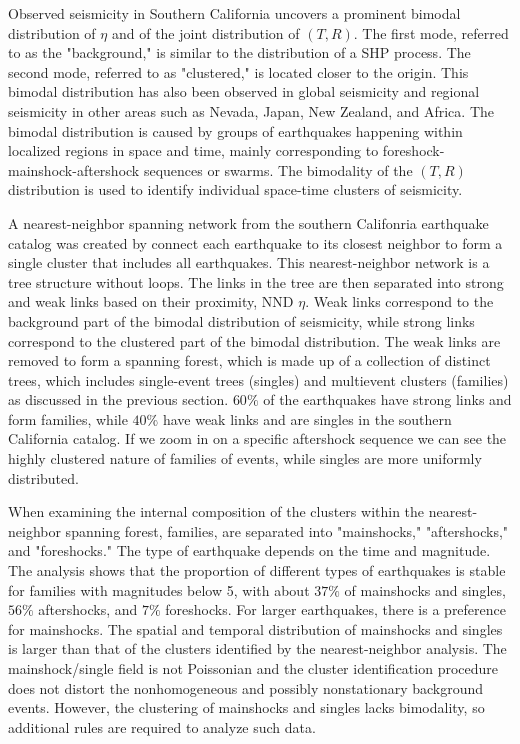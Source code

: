 \documentclass[12pt]{article} %
\theoremstyle{plain}
\begin{document}
	Observed seismicity in Southern California uncovers a prominent bimodal distribution of $\eta$ and of the joint distribution of $(T,R)$. The first mode, referred to as the "background," is similar to the distribution of a SHP process. The second mode, referred to as "clustered," is located closer to the origin. This bimodal distribution has also been observed in global seismicity and regional seismicity in other areas such as Nevada, Japan, New Zealand, and Africa. The bimodal distribution is caused by groups of earthquakes happening within localized regions in space and time, mainly corresponding to foreshock-mainshock-aftershock sequences or swarms. The bimodality of the $(T,R)$ distribution is used to identify individual space-time clusters of seismicity.
	
	A nearest-neighbor spanning network from the southern Califonria earthquake catalog was created by connect each earthquake to its closest neighbor to form a single cluster that includes all earthquakes. This nearest-neighbor network is a tree structure without loops. The links in the tree are then separated into strong and weak links based on their proximity, NND $\eta$. Weak links correspond to the background part of the bimodal distribution of seismicity, while strong links correspond to the clustered part of the bimodal distribution. The weak links are removed to form a spanning forest, which is made up of a collection of distinct trees, which includes single-event trees (singles) and multievent clusters (families) as discussed in the previous section. $60\%$ of the earthquakes have strong links and form families, while $40\%$ have weak links and are singles in the southern California catalog. If we zoom in on a specific aftershock sequence we can see the highly clustered nature of families of events, while singles are more uniformly distributed. 
	
	When examining the internal composition of the clusters within the nearest-neighbor spanning forest, families, are separated into "mainshocks," "aftershocks," and "foreshocks." The type of earthquake depends on the time and magnitude. The analysis shows that the proportion of different types of earthquakes is stable for families with magnitudes below 5, with about $37\%$ of mainshocks and singles, $56\%$ aftershocks, and $7\%$ foreshocks.  For larger earthquakes, there is a preference for mainshocks. The spatial and temporal distribution of mainshocks and singles is larger than that of the clusters identified by the nearest-neighbor analysis. The mainshock/single field is not Poissonian and the cluster identification procedure does not distort the nonhomogeneous and possibly nonstationary background events. However, the clustering of mainshocks and singles lacks bimodality, so additional rules are required to analyze such data.
	
\end{document}
